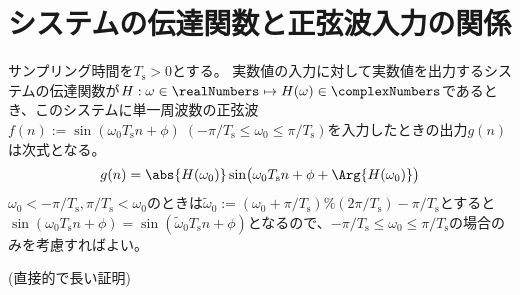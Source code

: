     \section{システムの伝達関数と正弦波入力の関係}
        \newcommand{\Ts}{T_\text{s}}
        \begin{shadebox}
            サンプリング時間を$\Ts>0$とする。
            実数値の入力に対して実数値を出力するシステムの伝達関数が$H:\omega\in\realNumbers\mapsto H(\omega)\in\complexNumbers$であるとき、このシステムに単一周波数の正弦波$f(n) := \sin(\omega_0 \Ts n + \phi)\;(-\pi/\Ts\leq\omega_0\leq\pi/\Ts)$を入力したときの出力$g(n)$は次式となる。
            \[ g(n) = \abs{H(\omega_0)}\sin\bigl(\omega_0 \Ts n + \phi + \Arg{H(\omega_0)}\bigr) \]
            $\omega_0<-\pi/\Ts, \pi/\Ts<\omega_0$のときは$\tilde{\omega}_0 := (\omega_0+\pi/\Ts)\%(2\pi/\Ts)-\pi/\Ts$とすると$\sin(\omega_0 \Ts n + \phi) = \sin(\tilde{\omega}_0 \Ts n + \phi)$となるので、$-\pi/\Ts\leq\omega_0\leq\pi/\Ts$の場合のみを考慮すればよい。
        \end{shadebox}
        (直接的で長い証明)

